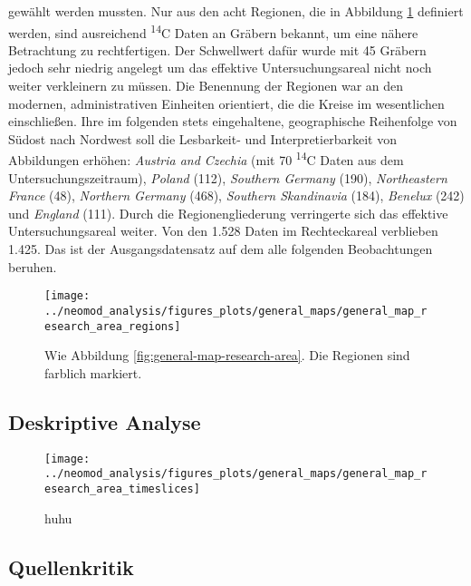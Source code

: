 \documentclass[openany,twoside,twocolumn]{book}
\begin{document}
gewählt werden mussten. Nur aus den acht Regionen, die in Abbildung
\ref{fig:general-map-research-area-regions} definiert werden, sind
ausreichend \textsuperscript{14}C Daten an Gräbern bekannt, um eine
nähere Betrachtung zu rechtfertigen. Der Schwellwert dafür wurde mit 45
Gräbern jedoch sehr niedrig angelegt um das effektive Untersuchungsareal
nicht noch weiter verkleinern zu müssen. Die Benennung der Regionen war
an den modernen, administrativen Einheiten orientiert, die die Kreise im
wesentlichen einschließen. Ihre im folgenden stets eingehaltene,
geographische Reihenfolge von Südost nach Nordwest soll die Lesbarkeit-
und Interpretierbarkeit von Abbildungen erhöhen: \emph{Austria and
Czechia} (mit 70 \textsuperscript{14}C Daten aus dem
Untersuchungszeitraum), \emph{Poland} (112), \emph{Southern Germany}
(190), \emph{Northeastern France} (48), \emph{Northern Germany} (468),
\emph{Southern Skandinavia} (184), \emph{Benelux} (242) und
\emph{England} (111). Durch die Regionengliederung verringerte sich das
effektive Untersuchungsareal weiter. Von den 1.528 Daten im
Rechteckareal verblieben 1.425. Das ist der Ausgangsdatensatz auf dem
alle folgenden Beobachtungen beruhen.

\begin{figure}
\texttt{[image: ../neomod\_analysis/figures\_plots/general\_maps/general\_map\_research\_area\_regions]} \caption[Karte mit \textsuperscript{14}C Daten, dem Untersuchungsareal und den künstlichen Regionen]{Wie Abbildung \ref{fig:general-map-research-area}. Die Regionen sind farblich markiert.}\label{fig:general-map-research-area-regions}
\end{figure}

\hypertarget{deskriptive-analyse}{%
\subsection{Deskriptive Analyse}\label{deskriptive-analyse}}

\begin{landscape}
\begin{figure}
\texttt{[image: ../neomod\_analysis/figures\_plots/general\_maps/general\_map\_research\_area\_timeslices]} \caption[huhu]{huhu}\label{fig:general-map-research-area-timeslices}
\end{figure}
\end{landscape}

\hypertarget{source-criticism}{%
\subsection{Quellenkritik}\label{source-criticism}}
\end{document}

